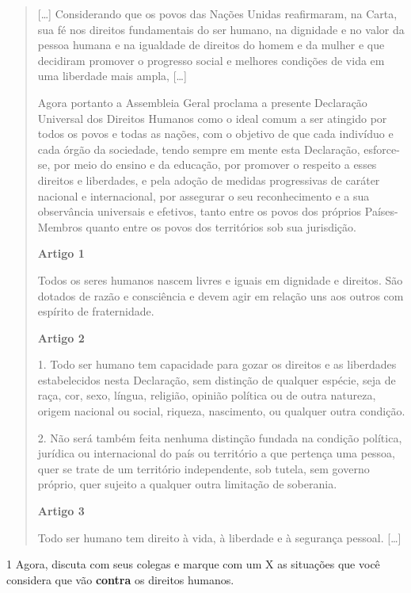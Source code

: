 \begin{quote}
{[}\ldots{}{]}
Considerando que os povos das Nações Unidas reafirmaram, na Carta, sua
fé nos direitos fundamentais do ser humano, na dignidade e no valor da
pessoa humana e na igualdade de direitos do homem e da mulher e que
decidiram promover o progresso social e melhores condições de vida em
uma liberdade mais ampla, {[}\ldots{}{]}

Agora portanto a Assembleia Geral proclama a presente Declaração
Universal dos Direitos Humanos como o ideal comum a ser atingido por
todos os povos e todas as nações, com o objetivo de que cada indivíduo e
cada órgão da sociedade, tendo sempre em mente esta Declaração,
esforce-se, por meio do ensino e da educação, por promover o respeito a
esses direitos e liberdades, e pela adoção de medidas progressivas de
caráter nacional e internacional, por assegurar o seu reconhecimento e a
sua observância universais e efetivos, tanto entre os povos dos próprios
Países-Membros quanto entre os povos dos territórios sob sua jurisdição.

\textbf{Artigo 1}

Todos os seres humanos nascem livres e iguais em dignidade e direitos.
São dotados de razão e consciência e devem agir em relação uns aos
outros com espírito de fraternidade.

\textbf{Artigo 2}

1. Todo ser humano tem capacidade para gozar os direitos e as liberdades
estabelecidos nesta Declaração, sem distinção de qualquer espécie, seja
de raça, cor, sexo, língua, religião, opinião política ou de outra
natureza, origem nacional ou social, riqueza, nascimento, ou qualquer
outra condição.

2. Não será também feita nenhuma distinção fundada na condição política,
jurídica ou internacional do país ou território a que pertença uma
pessoa, quer se trate de um território independente, sob tutela, sem
governo próprio, quer sujeito a qualquer outra limitação de soberania.

\textbf{Artigo 3}

Todo ser humano tem direito à vida, à liberdade e à segurança pessoal. {[}\ldots{}{]}

\end{quote}

\num{1} Agora, discuta com seus colegas e marque com um X as situações
que você considera que vão \textbf{contra} os direitos humanos.

